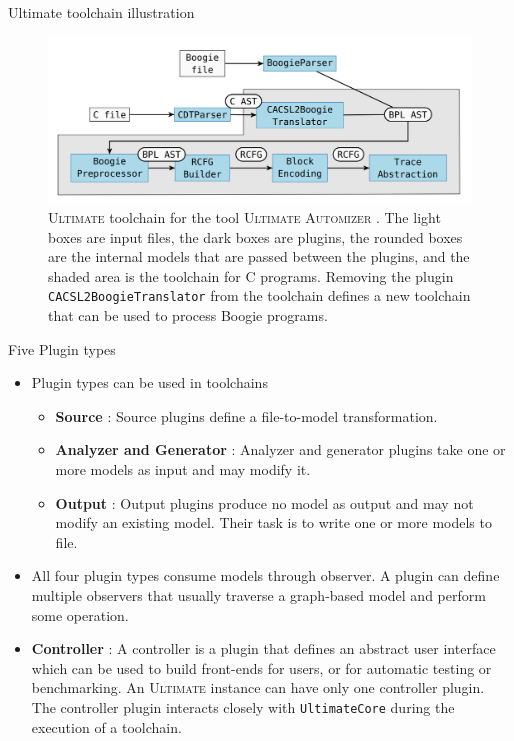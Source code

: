 \documentclass[12pt]{beamer}
\newcommand{\code}[1]{\texttt{#1}}
\newcommand{\ultimate}{\textsc{Ultimate }}
\newcommand{\automizer}{\textsc{Automizer }}
\begin{document}
\captionsetup[figure]{font=scriptsize ,labelfont=scriptsize}
\begin{frame}{Ultimate toolchain illustration}
    \begin{figure}
        \centering
        \includegraphics[scale=0.35]{toolchain.png}
        \caption{\ultimate toolchain for the tool \ultimate \automizer. The light boxes are input files, the dark boxes are plugins, the rounded boxes are the internal models that are passed between the plugins, and the shaded area is the toolchain for C programs. Removing the plugin \code{CACSL2BoogieTranslator} from the toolchain defines a new toolchain that can be used to process Boogie programs.
		}
    \end{figure}    
\end{frame}

\begin{frame}{Five Plugin types}
	\begin{itemize}
		\item Plugin types can be used in toolchains
		\begin{itemize}
			\item \textbf{Source} : Source plugins define a file-to-model transformation.
			\item \textbf{Analyzer and Generator} : Analyzer and generator plugins take one or more models as input and may modify it.
			\item \textbf{Output} : Output plugins produce no model as output and may not modify an existing model. Their task is to write one or more models to file.
		\end{itemize}
		\item All four plugin types consume models through observer. A plugin can define multiple observers that usually traverse a graph-based model and perform some operation.
		\item \textbf{Controller} : A controller is a plugin that defines an abstract user interface which can be used to build front-ends for users, or for automatic testing or benchmarking. An \ultimate instance can have only one controller plugin. The controller plugin interacts closely with \code{UltimateCore} during the execution of a toolchain.
	\end{itemize}
\end{frame}
\end{document}

